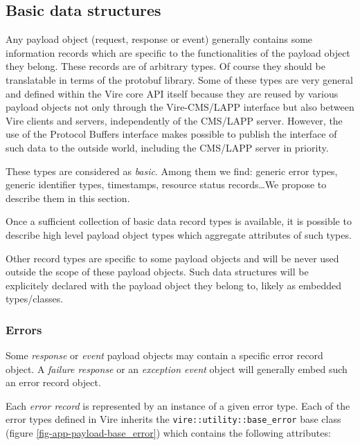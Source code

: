 \subsection{Basic data structures}

Any  payload object  (request, response  or event)  generally contains
some information records which are  specific to the functionalities of
the  payload  object they  belong.   These  records are  of  arbitrary
types. Of course they should be  translatable in terms of the protobuf
library.
Some of these types are very  general and defined within the Vire core
API itself because they are reused by various payload objects not only
through  the Vire-CMS/LAPP  interface  but also  between  Vire clients  and
servers, independently  of the  CMS/LAPP server.  However,  the use  of the
Protocol Buffers interface makes possible  to publish the interface of
such data to the outside world, including the CMS/LAPP server in priority.

These  types  are considered  as  \emph{basic}.  Among them  we  find:
generic error  types, generic  identifier types,  timestamps, resource
status records\dots We propose to describe them in this section.

Once a sufficient collection of  basic data record types is available,
it  is possible  to describe  high  level payload  object types  which
aggregate attributes of such types.

Other record  types are specific to  some payload objects and  will be
never  used outside  the scope  of these  payload objects.   Such data
structures will be  explicitely declared with the  payload object they
belong to, likely as embedded types/classes.


\subsubsection{Errors}

Some  \emph{response} or  \emph{event} payload  objects may  contain a
specific  error  record  object.   A  \emph{failure  response}  or  an
\emph{exception  event}  object will  generally  embed  such an  error
record object.

Each  \emph{error record}  is represented  by an  instance of  a given
error type.   Each of  the error  types defined  in Vire  inherits the
\texttt{vire::utility::base\_error}      base       class      (figure
\ref{fig-app-payload-base_error})   which   contains   the   following
attributes:

